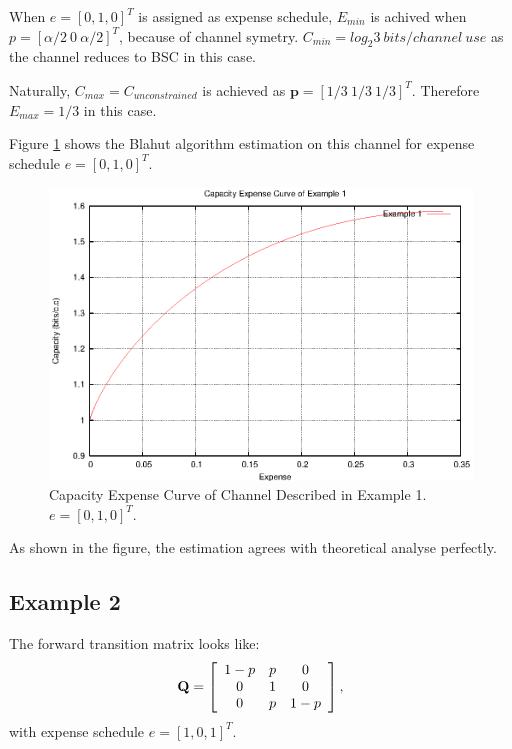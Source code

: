 \documentclass[a4paper,10pt]{article}
\begin{document}
When $e=[0,1,0]^T$ is assigned as expense schedule, $E_{min}$ is achived when $p=[\alpha/2\ 0\ \alpha/2]^T$, because of channel symetry. $C_{min}=log_2{3}\ bits/channel\ use$ as the channel reduces to BSC in this case.

Naturally, $C_{max}=C_{unconstrained}$ is achieved as $\mathbf{p}=[1/3\ 1/3\ 1/3]^T$. Therefore $E_{max}=1/3$ in this case.

Figure \ref{fig:example1_cap} shows the Blahut algorithm estimation on this channel for expense schedule $e=[0,1,0]^T$.
\begin{figure}
 \centering
 \includegraphics[bb=50 50 410 302]{pic/example1_cap.eps}
 \caption{Capacity Expense Curve of Channel Described in Example 1. $e=[0,1,0]^T$.}
 \label{fig:example1_cap}
\end{figure}
As shown in the figure, the estimation agrees with theoretical analyse perfectly.

\subsection{Example 2}
The forward transition matrix looks like:
\begin{displaymath}
\mathbf{Q}=\left[ 
\begin{array}[c]{ccc}
1-p & p & 0 \\ 
0 & 1 & 0 \\ 
0 & p & 1-p
\end{array}\right], 
\end{displaymath}
with expense schedule $e=[1,0,1]^T$.
\end{document}
